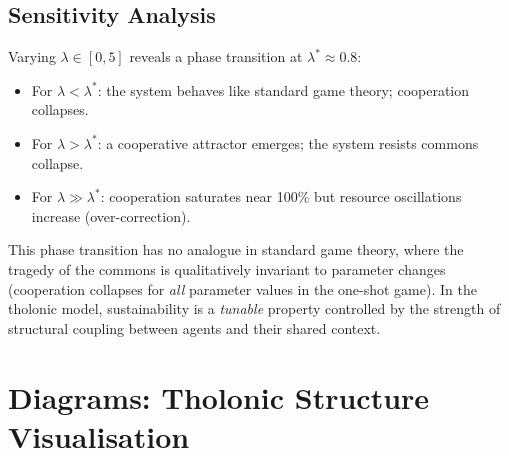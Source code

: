\documentclass[12pt,a4paper,twocolumn]{article}
\begin{document}
\subsection{Sensitivity Analysis}

Varying $\lambda \in [0, 5]$ reveals a phase transition at $\lambda^* \approx 0.8$:

\begin{itemize}[nosep]
  \item For $\lambda < \lambda^*$: the system behaves like standard game theory; cooperation collapses.
  \item For $\lambda > \lambda^*$: a cooperative attractor emerges; the system resists commons collapse.
  \item For $\lambda \gg \lambda^*$: cooperation saturates near 100\% but resource oscillations increase (over-correction).
\end{itemize}

This phase transition has no analogue in standard game theory, where the tragedy of the commons is qualitatively invariant to parameter changes (cooperation collapses for \emph{all} parameter values in the one-shot game).
In the tholonic model, sustainability is a \emph{tunable} property controlled by the strength of structural coupling between agents and their shared context.

\section{Diagrams: Tholonic Structure Visualisation}
\label{sec:diagrams}
\end{document}

